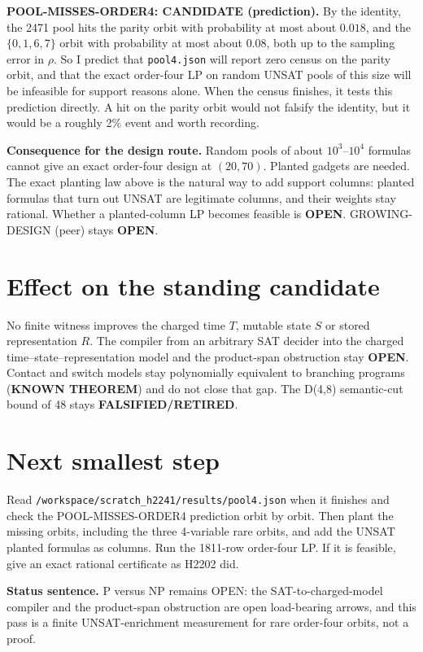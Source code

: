 \documentclass[11pt]{article}
\begin{document}
\textbf{POOL-MISSES-ORDER4: CANDIDATE (prediction).} By the identity, the 2471 pool hits the parity orbit with probability at most about $0.018$, and the $\{0,1,6,7\}$ orbit with probability at most about $0.08$, both up to the sampling error in $\rho$. So I predict that \texttt{pool4.json} will report zero census on the parity orbit, and that the exact order-four LP on random UNSAT pools of this size will be infeasible for support reasons alone. When the census finishes, it tests this prediction directly. A hit on the parity orbit would not falsify the identity, but it would be a roughly 2\% event and worth recording.

\textbf{Consequence for the design route.} Random pools of about $10^3$--$10^4$ formulas cannot give an exact order-four design at $(20,70)$. Planted gadgets are needed. The exact planting law above is the natural way to add support columns: planted formulas that turn out UNSAT are legitimate columns, and their weights stay rational. Whether a planted-column LP becomes feasible is \textbf{OPEN}. GROWING-DESIGN (peer) stays \textbf{OPEN}.

\section*{Effect on the standing candidate}
No finite witness improves the charged time $T$, mutable state $S$ or stored representation $R$. The compiler from an arbitrary SAT decider into the charged time--state--representation model and the product-span obstruction stay \textbf{OPEN}. Contact and switch models stay polynomially equivalent to branching programs (\textbf{KNOWN THEOREM}) and do not close that gap. The D(4,8) semantic-cut bound of 48 stays \textbf{FALSIFIED/RETIRED}.

\section*{Next smallest step}
Read \texttt{/workspace/scratch\_h2241/results/pool4.json} when it finishes and check the POOL-MISSES-ORDER4 prediction orbit by orbit. Then plant the missing orbits, including the three 4-variable rare orbits, and add the UNSAT planted formulas as columns. Run the 1811-row order-four LP. If it is feasible, give an exact rational certificate as H2202 did.

\bigskip
\noindent\textbf{Status sentence.} P versus NP remains OPEN: the SAT-to-charged-model compiler and the product-span obstruction are open load-bearing arrows, and this pass is a finite UNSAT-enrichment measurement for rare order-four orbits, not a proof.
\end{document}
